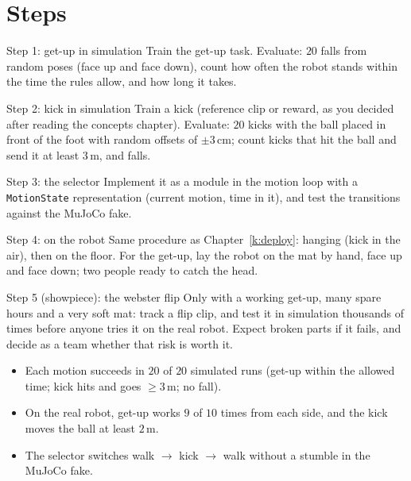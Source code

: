 \section*{Steps}
\begin{stepbox}{Step 1: get-up in simulation}
Train the get-up task. Evaluate: $20$ falls from random poses (face up and face down), count how often the robot stands within the time the rules allow, and how long it takes.
\end{stepbox}
\begin{stepbox}{Step 2: kick in simulation}
Train a kick (reference clip or reward, as you decided after reading the concepts chapter). Evaluate: $20$ kicks with the ball placed in front of the foot with random offsets of $\pm3$\,cm; count kicks that hit the ball and send it at least $3$\,m, and falls.
\end{stepbox}
\begin{stepbox}{Step 3: the selector}
Implement it as a module in the motion loop with a \texttt{MotionState} representation (current motion, time in it), and test the transitions against the MuJoCo fake.
\end{stepbox}
\begin{stepbox}{Step 4: on the robot}
Same procedure as Chapter~\ref{k:deploy}: hanging (kick in the air), then on the floor. For the get-up, lay the robot on the mat by hand, face up and face down; two people ready to catch the head.
\end{stepbox}
\begin{stepbox}{Step 5 (showpiece): the webster flip}
Only with a working get-up, many spare hours and a very soft mat: track a flip clip, and test it in simulation thousands of times before anyone tries it on the real robot. Expect broken parts if it fails, and decide as a team whether that risk is worth it.
\end{stepbox}

\begin{checkbox}
\begin{itemize}[nosep]
  \item Each motion succeeds in $20$ of $20$ simulated runs (get-up within the allowed time; kick hits and goes $\ge3$\,m; no fall).
  \item On the real robot, get-up works $9$ of $10$ times from each side, and the kick moves the ball at least $2$\,m.
  \item The selector switches walk $\rightarrow$ kick $\rightarrow$ walk without a stumble in the MuJoCo fake.
\end{itemize}
\end{checkbox}

